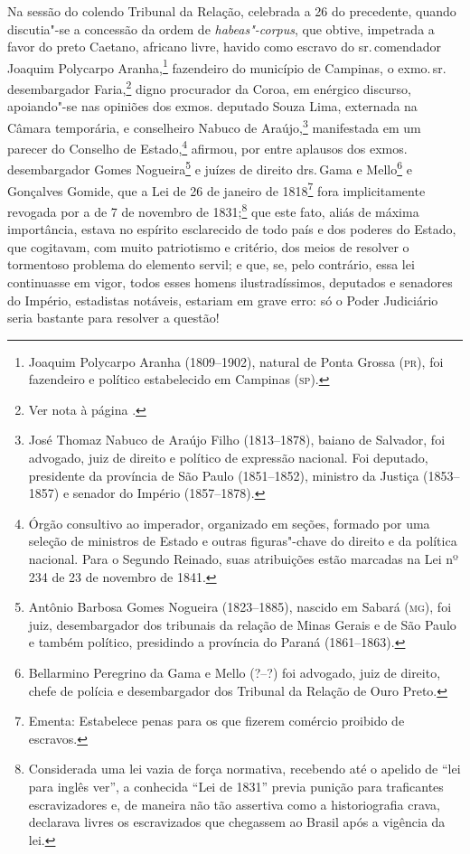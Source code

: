 \noindent{}Na sessão do colendo Tribunal da Relação, celebrada a 26 do precedente,
quando discutia"-se a concessão da ordem de \emph{habeas"-corpus}, que
obtive, impetrada a favor do preto Caetano, africano livre, havido como
escravo do sr.\,comendador Joaquim Polycarpo Aranha,\footnote{Joaquim
  Polycarpo Aranha (1809--1902), natural de Ponta Grossa (\textsc{pr}), foi
  fazendeiro e político estabelecido em Campinas (\textsc{sp}).} fazendeiro do
município de Campinas, o exmo.\,sr.\,desembargador Faria,\footnote{Ver nota à página \pageref{jff}.} digno procurador da Coroa, em enérgico discurso,
apoiando"-se nas opiniões dos exmos. deputado Souza Lima, externada na
Câmara temporária, e conselheiro Nabuco de Araújo,\footnote{José
  Thomaz Nabuco de Araújo Filho (1813--1878), baiano de Salvador, foi
  advogado, juiz de direito e político de expressão nacional. Foi
  deputado, presidente da província de São Paulo (1851--1852), ministro
  da Justiça (1853--1857) e senador do Império (1857--1878).} manifestada
em um parecer do Conselho de Estado,\footnote{Órgão consultivo ao
  imperador, organizado em seções, formado por uma seleção de ministros
  de Estado e outras figuras"-chave do direito e da política nacional.
  Para o Segundo Reinado, suas atribuições estão marcadas na Lei nº 234
  de 23 de novembro de 1841.} afirmou, por entre aplausos dos exmos.
desembargador Gomes Nogueira\footnote{Antônio Barbosa Gomes Nogueira
  (1823--1885), nascido em Sabará (\textsc{mg}), foi juiz, desembargador dos
  tribunais da relação de Minas Gerais e de São Paulo e também
  político, presidindo a província do Paraná (1861--1863).} e juízes de
direito drs.\,Gama e Mello\footnote{Bellarmino Peregrino da Gama e
  Mello (?--?) foi advogado, juiz de direito, chefe de polícia e
  desembargador dos Tribunal da Relação de Ouro Preto.} e Gonçalves
Gomide, que a Lei de 26 de janeiro de 1818\footnote{Ementa: Estabelece
  penas para os que fizerem comércio proibido de escravos.} fora
implicitamente revogada por a de 7 de novembro de 1831;\footnote{
  Considerada uma lei vazia de força normativa, recebendo até o apelido
  de ``lei para inglês ver'', a conhecida ``Lei de 1831'' previa punição
  para traficantes escravizadores e, de maneira não tão assertiva como a
  historiografia crava, declarava livres os escravizados que chegassem
  ao Brasil após a vigência da lei.} que este fato, aliás de máxima
importância, estava no espírito esclarecido de todo país e dos poderes
do Estado, que cogitavam, com muito patriotismo e critério, dos meios de
resolver o tormentoso problema do elemento servil; e que, se, pelo
contrário, essa lei continuasse em vigor, todos esses homens
ilustradíssimos, deputados e senadores do Império, estadistas notáveis,
estariam em grave erro: só o Poder Judiciário seria bastante para
resolver a questão!

